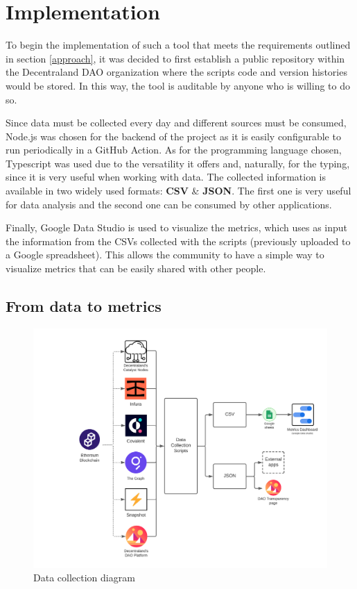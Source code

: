 \documentclass[MSE,Master,english]{twbook}%
\begin{document}
\section{Implementation}
To begin the implementation of such a tool that meets the requirements outlined in section \ref{approach}, it was decided to first establish a public repository\cite{transparencyRepo} within the Decentraland DAO organization where the scripts code and version histories would be stored. In this way, the tool is auditable by anyone who is willing to do so.

Since data must be collected every day and different sources must be consumed, Node.js was chosen for the backend of the project as it is easily configurable to run periodically in a GitHub Action\cite{ghAction}. As for the programming language chosen, Typescript was used due to the versatility it offers and, naturally, for the typing, since it is very useful when working with data. The collected information is available in two widely used formats: \textbf{CSV} \& \textbf{JSON}. The first one is very useful for data analysis and the second one can be consumed by other applications.

Finally, Google Data Studio\cite{transparencyDashboard} is used to visualize the metrics, which uses as input the information from the CSVs collected with the scripts (previously uploaded to a Google spreadsheet). This allows the community to have a simple way to visualize metrics that can be easily shared with other people.

\subsection{From data to metrics}
\begin{figure}[H]
  \centering
  \includegraphics[width=\textwidth]{diagrama.png}
  \caption{Data collection diagram}
  \label{fig:diagram}
\end{figure}
\end{document}
